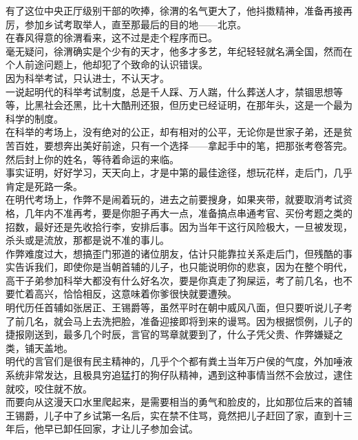 \begin{multicols}{\theparacolNo}
有了这位中央正厅级别干部的吹捧，徐渭的名气更大了，他抖擞精神，准备再接再厉，参加乡试考取举人，直至那最后的目的地——北京。\\

在春风得意的徐渭看来，这不过是走个程序而已。\\

毫无疑问，徐渭确实是个少有的天才，他多才多艺，年纪轻轻就名满全国，然而在个人前途问题上，他却犯了个致命的认识错误。\\

因为科举考试，只认进士，不认天才。\\

一说起明代的科举考试制度，总是千人踩、万人踹，什么葬送人才，禁锢思想等等，比黑社会还黑，比十大酷刑还狠，但历史已经证明，在那年头，这是一个最为科学的制度。\\

在科举的考场上，没有绝对的公正，却有相对的公平，无论你是世家子弟，还是贫苦百姓，要想奔出美好前途，只有一个选择——拿起手中的笔，把那张考卷答完。然后封上你的姓名，等待着命运的来临。\\

事实证明，好好学习，天天向上，才是中第的最佳途径，想玩花样，走后门，几乎肯定是死路一条。\\

在明代考场上，作弊不是闹着玩的，进去之前要搜身，如果夹带，就要取消考试资格，几年内不准再考，要是你胆子再大一点，准备搞点串通考官、买份考题之类的招数，最好还是先收拾行李，安排后事。因为当年干这行风险极大，一旦被发现，杀头或是流放，那都是说不准的事儿。\\

作弊难度过大，想搞歪门邪道的诸位朋友，估计只能靠拉关系走后门，但残酷的事实告诉我们，即使你是当朝首辅的儿子，也只能说明你的悲哀，因为在整个明代，高干子弟参加科举大都没有什么好名次，要是你真走了狗屎运，考了前几名，也不要忙着高兴，恰恰相反，这意味着你爹很快就要遭殃。\\

明代历任首辅如张居正、王锡爵等，虽然平时在朝中威风八面，但只要听说儿子考了前几名，就会马上去洗把脸，准备迎接即将到来的谩骂。因为根据惯例，儿子的捷报刚送到，最多几个时辰，言官的骂章就要到了，什么子凭父贵、作弊嫌疑之类，铺天盖地。\\

明代的言官们是很有民主精神的，几乎个个都有粪土当年万户侯的气度，外加唾液系统非常发达，且极具穷追猛打的狗仔队精神，遇到这种事情当然不会放过，逮住就咬，咬住就不放。\\

而要向从这漫天口水里爬起来，是需要相当的勇气和脸皮的，比如那位后来的首辅王锡爵，儿子中了乡试第一名后，实在禁不住骂，竟然把儿子赶回了家，直到十三年后，他早已卸任回家，才让儿子参加会试。\\


\end{multicols}
